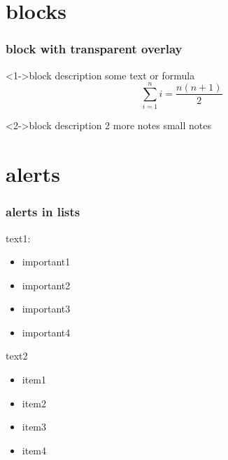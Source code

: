 \documentclass{beamer}
\begin{document}
\section{blocks}
\begin{frame}
  \tableofcontents[currentsection]
\end{frame}

% 
\begin{frame}
\frametitle{block with transparent overlay}


\begin{block}<1->{block description}
  some text or formula $$\sum\limits_{i=1}^n i = \frac{n (n+1)}{2}$$
\end{block}

\begin{block}<2->{block description 2}
  more notes {\tiny small notes}
\end{block}

\end{frame}

% 
\section{alerts}
\begin{frame}
  \tableofcontents[currentsection]
\end{frame}

% 
\begin{frame}
\frametitle{alerts in lists}

text1:
\begin{itemize}[<+-| alert@+>]
\item important1
\item important2
\item important3
\item important4
\end{itemize}

text2
\begin{itemize}
\item<alert@5> item1
\item<alert@6> item2
\item<alert@7> item3
\item<alert@8> item4
\end{itemize}

\end{frame}
\end{document}
